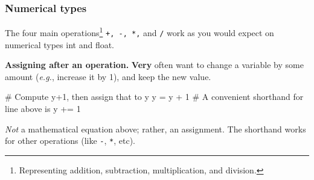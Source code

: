 \documentclass{beamer}
\newenvironment{codeblock}
    {\hfill\begin{beamerboxesrounded}[lower=codecol, width=0.8\textwidth]
    \medskip

    }
    { 
    \end{beamerboxesrounded}\hfill
    }
\theoremstyle{example}
\newcommand{\ct}[1]{\lstinline[language=Python]!#1!}
\newcommand{\ttt}[1]{{\small\texttt{#1}}}
\newcommand{\comment}[1]{}
\begin{document}
\begin{frame}[fragile]
\frametitle{Numerical types}

The four main operations\footnote{Representing addition, subtraction, multiplication, and division.} \ttt{+, -, *,} and \ttt{/} work as you would expect on numerical types {\ttb int} and {\ttb float}.


{\bf \color{mygreen} Assigning after an operation.} {\bf Very} often want to change a variable by some amount (\textit{e.g.}, increase it by 1), and keep the new value.

\begin{codeblock}

\begin{python}
# Compute y+1, then assign that to y
y = y + 1
# A convenient shorthand for line above is
y += 1
\end{python}

\end{codeblock}

\emph{Not} a mathematical equation above; rather, an assignment. The shorthand works for other operations (like \ttt{-}, \ttt{*}, etc).
\end{frame}

\comment{
\begin{frame}[fragile]
\frametitle{Logical types and {\ttm None}}

We have some logical types, as every language needs {--} \ttt{True} and \ttt{False}. 

Usually, no need to directly assign or work with these. They are ``under the hood'' when making comparisons. 
\begin{itemize}
	\item Technically, \ttt{True} and \ttt{False} are like \ct{1} and \ct{0} in Python. Use this fact only with \emph{extreme care}! (Maybe just avoid it.)
\end{itemize}
\begin{codeblock}

\begin{python}[numbers=none]
(*@\color{numeric}True@*)*(*@\color{numeric}False@*)
\end{python}

\end{codeblock}

$\qquad \uparrow$ the line above will return \ct{0}.
\vspace*{12pt}

The \emph{null} type in Python is \ttt{None}. We'll talk about using it in later lectures.
\end{frame}
}
\end{document}
